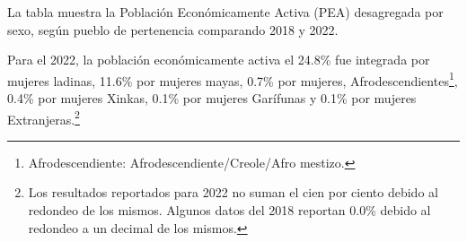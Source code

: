 La tabla muestra la Población Económicamente Activa (PEA) desagregada por sexo, según pueblo de pertenencia comparando 2018 y 2022.

Para el 2022, la población económicamente activa el 24.8\% fue integrada por mujeres ladinas, 11.6\% por mujeres mayas, 0.7\% por mujeres, Afrodescendientes\footnote{Afrodescendiente: Afrodescendiente/Creole/Afro mestizo.}, 0.4\% por mujeres Xinkas, 0.1\% por mujeres Garífunas y 0.1\% por mujeres Extranjeras.\footnote{Los resultados reportados para 2022 no suman el cien por ciento debido al redondeo de los mismos. Algunos datos del 2018 reportan 0.0\% debido al redondeo a un decimal de los mismos.}
